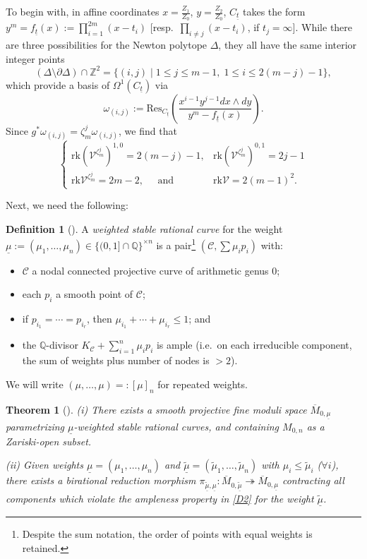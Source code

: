 \documentclass[12pt,letterpaper,english]{amsart}
\numberwithin{equation}{section}
\numberwithin{figure}{section}
\theoremstyle{plain}
\newtheorem{thm}[equation]{Theorem}
\theoremstyle{remark}
\theoremstyle{definition}
\newtheorem{defn}[equation]{Definition}
\theoremstyle{definition}
\theoremstyle{plain}
\theoremstyle{plain}
\theoremstyle{plain}
\theoremstyle{plain}
\theoremstyle{definition}
\def\ut{\underline{t}}
\def\QQ{\mathbb{Q}}
\def\ZZ{\mathbb{Z}}
\def\ut{\underline{t}}
\def\V{\mathcal{V}}
\def\sm{\setminus}
\theoremstyle{definition}
\begin{document}
To begin with, in affine coordinates $x=\tfrac{Z_1}{Z_0}$, $y=\tfrac{Z_2}{Z_0}$, $C_{\ut}$ takes the form $y^m=f_{\ut}(x):=\prod_{i=1}^{2m}(x-t_i)$ [resp.~$\prod_{i\neq j}(x-t_i)$, if $t_j=\infty$]. While there are three possibilities for the Newton polytope $\Delta$, they all have the same interior integer points
$$(\Delta\sm\partial\Delta)\cap \ZZ^2=\{(i,j)\mid 1\leq j\leq m-1,\;1\leq i\leq 2(m-j)-1\},$$
which provide a basis of $\Omega^1(C_{\ut})$ via
$$\omega_{(i,j)}:=\mathrm{Res}_{C_{\ut}}\left(\frac{x^{i-1}y^{j-1}dx\wedge dy}{y^m-f_{\ut}(x)}\right).$$
Since $g^*\omega_{(i,j)}=\zeta_m^j\omega_{(i,j)}$, we find that 
\begin{equation}\label{D1}
\left\{\begin{array}{cc} \mathrm{rk}(\V^{\zeta_m^j})^{1,0}=2(m-j)-1, & \mathrm{rk}(\V^{\zeta_m^j})^{0,1}=2j-1 \\ \mathrm{rk}\V^{\zeta_m^j}=2m-2,\;\;\;\;\;\text{and} & \mathrm{rk}\V=2(m-1)^2. \end{array}\right.	
\end{equation}

Next, we need the following:
\begin{defn}[\cite{Ha}]\label{D2}
A \emph{weighted stable rational curve} for the weight $\underline{\mu}:=(\mu_1,\ldots,\mu_n)\in \{(0,1]\cap \QQ\}^{\times n}$ is a pair\footnote{Despite the sum notation, the order of points with equal weights is retained.} $(\mathcal{C},\sum\mu_i p_i)$ with:
\begin{itemize}[leftmargin=0.5cm]
\item $\mathcal{C}$ a nodal connected projective curve of arithmetic genus $0$;
\item each $p_i$ a smooth point of $\mathcal{C}$;
\item if $p_{i_1}=\cdots =p_{i_r}$, then $\mu_{i_1}+\cdots+\mu_{i_r}\leq 1$; and
\item the $\QQ$-divisor $K_{\mathcal{C}}+\sum_{i=1}^n \mu_i p_i$ is ample (i.e.~on each irreducible component, the sum of weights plus number of nodes is $>2$).
\end{itemize}
We will write $(\mu,\ldots,\mu)=:[\mu]_n$ for repeated weights.
\end{defn}

\begin{thm}[\cite{Ha}]\label{D3}
\textup{(i)} There exists a smooth projective fine moduli space $\overline{M}_{0,\underline{\mu}}$ parametrizing $\underline{\mu}$-weighted stable rational curves, and containing $M_{0,n}$ as a Zariski-open subset.

\textup{(ii)}	 Given weights $\underline{\mu}=(\mu_1,\ldots,\mu_n)$ and $\tilde{\underline{\mu}}=(\tilde{\mu}_1,\ldots,\tilde{\mu}_n)$ with $\mu_i\leq \tilde{\mu}_i$ \textup{(}$\forall i$\textup{)}, there exists a birational \emph{reduction morphism} $\pi_{\tilde{\underline{\mu}},\underline{\mu}}\colon \overline{M}_{0,\tilde{\underline{\mu}}}\twoheadrightarrow \overline{M}_{0,\underline{\mu}}$ contracting all components which violate the ampleness property in \eqref{D2} for the weight $\tilde{\underline{\mu}}$.
\end{thm}
\end{document}
